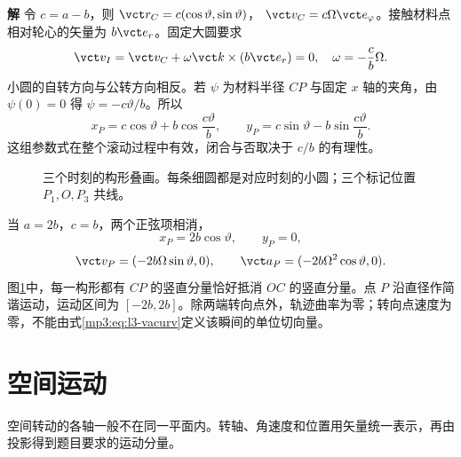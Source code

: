 \documentclass[11pt,openany,fontset=fandol]{ctexbook}
\theoremstyle{definition}\newtheorem{example}{例}[chapter]\newtheorem{exercise}{习题}[chapter]
\newcommand{\SolutionStart}{\par\medskip\ifdim\pagetotal>0pt\ifdim\dimexpr\pagegoal-\pagetotal\relax<3\baselineskip\newpage\fi\fi\noindent\textbf{解}\quad\ignorespaces}
\newenvironment{solution}{\SolutionStart}{\par\medskip}
\begin{document}
\begin{solution}
令 $c=a-b$，则 $\vct r_C=c(\cos\vartheta,\sin\vartheta)$，
$\vct v_C=c\Omega\vct e_\varphi$。接触材料点相对轮心的矢量为 $b\vct e_r$。固定大圆要求
\[
\vct v_I=\vct v_C+\omega\vct k\times(b\vct e_r)=0,
\quad \omega=-\frac cb\Omega.
\]
小圆的自转方向与公转方向相反。若 $\psi$ 为材料半径 $CP$ 与固定 $x$ 轴的夹角，由 $\psi(0)=0$ 得 $\psi=-c\vartheta/b$。所以
\[
x_P=c\cos\vartheta+b\cos\frac{c\vartheta}{b},\qquad
y_P=c\sin\vartheta-b\sin\frac{c\vartheta}{b}.
\]
这组参数式在整个滚动过程中有效，闭合与否取决于 $c/b$ 的有理性。

\begin{figure}[H]\centering
{}
\caption{三个时刻的构形叠画。每条细圆都是对应时刻的小圆；三个标记位置 $P_1,O,P_3$ 共线。}\label{mp3:fig:l3-e6-s}
\end{figure}


当 $a=2b$，$c=b$，两个正弦项相消，
\[
x_P=2b\cos\vartheta,\qquad y_P=0,
\]
\[
\vct v_P=(-2b\Omega\sin\vartheta,0),\qquad
\vct a_P=(-2b\Omega^2\cos\vartheta,0).
\]
图\ref{mp3:fig:l3-e6-s}中，每一构形都有 $CP$ 的竖直分量恰好抵消 $OC$ 的竖直分量。点 $P$ 沿直径作简谐运动，运动区间为 $[-2b,2b]$。除两端转向点外，轨迹曲率为零；转向点速度为零，不能由式\eqref{mp3:eq:l3-vacurv}定义该瞬间的单位切向量。

\end{solution}

\section{空间运动}
空间转动的各轴一般不在同一平面内。转轴、角速度和位置用矢量统一表示，再由投影得到题目要求的运动分量。
\end{document}

